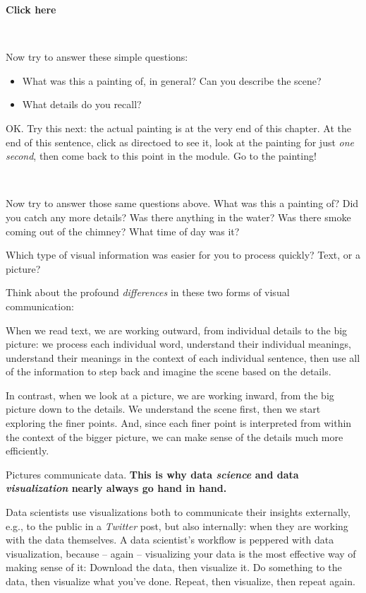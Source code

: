\documentclass[
]{book}
\begin{document}
\textbf{Click here}

~

Now try to answer these simple questions:

\begin{itemize}
\item
  What was this a painting of, in general? Can you describe the scene?
\item
  What details do you recall?
\end{itemize}

OK. Try this next: the actual painting is at the very end of this chapter. At the end of this sentence, click as directoed to see it, look at the painting for just \emph{one second}, then come back to this point in the module. Go to the painting!

~

Now try to answer those same questions above. What was this a painting of? Did you catch any more details? Was there anything in the water? Was there smoke coming out of the chimney? What time of day was it?

Which type of visual information was easier for you to process quickly? Text, or a picture?

Think about the profound \emph{differences} in these two forms of visual communication:

When we read text, we are working outward, from individual details to the big picture: we process each individual word, understand their individual meanings, understand their meanings in the context of each individual sentence, then use all of the information to step back and imagine the scene based on the details.

In contrast, when we look at a picture, we are working inward, from the big picture down to the details. We understand the scene first, then we start exploring the finer points. And, since each finer point is interpreted from within the context of the bigger picture, we can make sense of the details much more efficiently.

Pictures communicate data. \textbf{This is why data \emph{science} and data \emph{visualization} nearly always go hand in hand.}

Data scientists use visualizations both to communicate their insights externally, e.g., to the public in a \emph{Twitter} post, but also internally: when they are working with the data themselves. A data scientist's workflow is peppered with data visualization, because -- again -- visualizing your data is the most effective way of making sense of it: Download the data, then visualize it. Do something to the data, then visualize what you've done. Repeat, then visualize, then repeat again.
\end{document}
